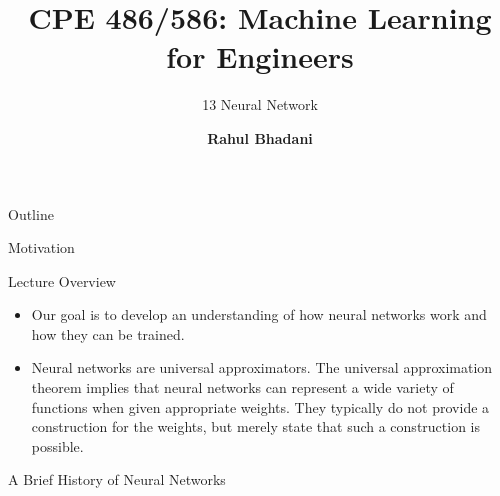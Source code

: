 \documentclass[aspectratio=169,xcolor=dvipsnames,svgnames,x11names,fleqn]{beamer}
\title[CPE 486/586: Machine Learning]{CPE 486/586: Machine Learning for Engineers} %
\subtitle{13 Neural Network}
\author[Rahul Bhadani] {{\Large \textbf{Rahul Bhadani}}}
\institute[UAH] %
{
    Electrical \& Computer Engineering,  The University of Alabama in Huntsville
}
\date
\begin{document}
\begin{frame}
    \titlepage
\end{frame}

\begin{frame}{Outline}
    \backgroundtableofcontents
\end{frame}






\begin{sectionframe}{\faChild}{Motivation}
\end{sectionframe}


\begin{frame}{Lecture Overview}
    \begin{itemize}
        \item Our goal is to develop an understanding of how neural networks work and how they can be trained. 
        \item Neural networks are universal approximators. The universal approximation theorem implies that neural networks can represent a wide variety of functions when given appropriate weights. They typically do not provide a construction for the weights, but merely state that such a construction is possible.
    \end{itemize}
\end{frame}



\begin{sectionframe}{\faFa}{A Brief History of Neural Networks}
\end{sectionframe}
\end{document}
